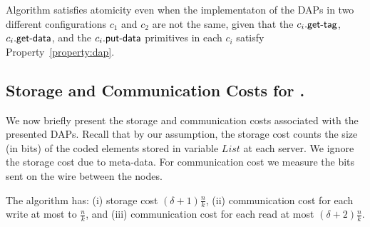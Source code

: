 
\begin{remark}
	Algorithm \ares{} satisfies atomicity even when the implementaton of the  DAPs in two 
	different configurations $c_1$ and $c_2$ are not the same, given that the $c_i.\act{get-tag}$,
	$c_i.\act{get-data}$, and the $c_i.\act{put-data}$ primitives 
	in each $c_i$ satisfy Property~\ref{property:dap}.  
\end{remark}

\subsection{Storage and Communication Costs for \ares{}.}\label{sec:safety:c}
We now briefly present the storage and communication costs associated with the presented DAPs.
Recall that by our assumption, the storage cost counts the size (in bits) of the coded elements 
stored in variable  $List$  at each server. We ignore the storage cost due to meta-data.
For  communication cost we measure the bits sent on the wire between the nodes.

\begin{theorem}\label{treas:performance}
 The \ares{} algorithm has: (i) storage cost $(\delta +1 )\frac{n}{k}$, (ii) communication 
cost for each write at most to $\frac{n}{k}$, and (iii) communication 
cost for each read at most $(\delta +2)\frac{n}{k}$.
\end{theorem}


